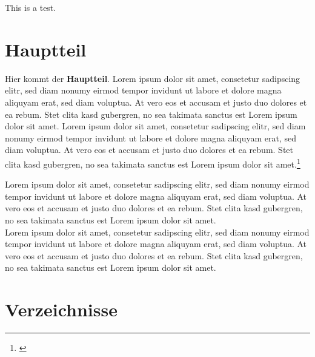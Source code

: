 \documentclass[a4paper,12pt]{article}
\begin{document}
This is a test.
\newpage

\section{Hauptteil}

Hier kommt der \textbf{Hauptteil}. Lorem ipsum dolor sit amet, consetetur sadipscing elitr, sed diam nonumy eirmod tempor invidunt ut labore et dolore magna aliquyam erat, sed diam voluptua. At vero eos et accusam et justo duo dolores et ea rebum. Stet clita kasd gubergren, no sea takimata sanctus est Lorem ipsum dolor sit amet. Lorem ipsum dolor sit amet, consetetur sadipscing elitr, sed diam nonumy eirmod tempor invidunt ut labore et dolore magna aliquyam erat, sed diam voluptua. At vero eos et accusam et justo duo dolores et ea rebum. Stet clita kasd gubergren, no sea takimata sanctus est Lorem ipsum dolor sit amet.\footnote{\cite[S. 20ff]{Dembowski.2019}}	%
\par
Lorem ipsum dolor sit amet, consetetur sadipscing elitr, sed diam nonumy eirmod tempor invidunt ut labore et dolore magna aliquyam erat, sed diam voluptua. At vero eos et accusam et justo duo dolores et ea rebum. Stet clita kasd gubergren, no sea takimata sanctus est Lorem ipsum dolor sit amet.
\\[0,5cm]
Lorem ipsum dolor sit amet, consetetur sadipscing elitr, sed diam nonumy eirmod tempor invidunt ut labore et dolore magna aliquyam erat, sed diam voluptua. At vero eos et accusam et justo duo dolores et ea rebum. Stet clita kasd gubergren, no sea takimata sanctus est Lorem ipsum dolor sit amet.

\newpage

\section{Verzeichnisse}
\listoffigures %
\end{document}
